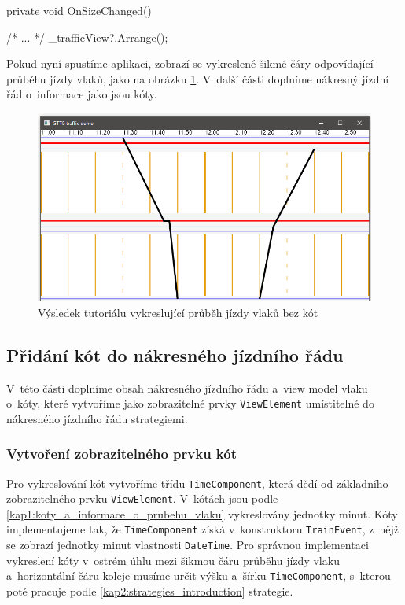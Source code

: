\begin{csharpcode}
private void OnSizeChanged() {
	
	/* ... */
	_trafficView?.Arrange();
}
\end{csharpcode}

Pokud nyní spustíme aplikaci, zobrazí se vykreslené šikmé čáry odpovídající průběhu jízdy vlaků, jako na obrázku \ref{fig:kap5:traffic_demo_without_time_components}. V~další části doplníme nákresný jízdní řád o~informace jako jsou kóty.

\begin{figure}[!hbt]
	\centering
	\includegraphics[width=.8\textwidth]{../img/kap5_tutorial_traffic_result}
	\caption{Výsledek tutoriálu vykreslující průběh jízdy vlaků bez kót}
	\label{fig:kap5:traffic_demo_without_time_components}
\end{figure}

\subsection*{Přidání kót do nákresného jízdního řádu}
V~této části doplníme obsah nákresného jízdního řádu a~view model vlaku o~kóty, které vytvoříme jako zobrazitelné prvky \texttt{ViewElement} umístitelné do nákresného jízdního řádu strategiemi.

\subsubsection*{Vytvoření zobrazitelného prvku kót}
Pro vykreslování kót vytvoříme třídu \texttt{TimeComponent}, která dědí od základního zobrazitelného prvku \texttt{ViewElement}. V~kótách jsou podle \ref{kap1:koty_a_informace_o_prubehu_vlaku} vykreslovány jednotky minut. Kóty implementujeme tak, že \texttt{TimeComponent} získá v~konstruktoru \texttt{TrainEvent}, z~nějž se zobrazí jednotky minut vlastnosti \texttt{DateTime}. Pro správnou implementaci vykreslení kóty v~ostrém úhlu mezi šikmou čáru průběhu jízdy vlaku a~horizontální čáru koleje musíme určit výšku a~šírku \texttt{TimeComponent}, s~kterou poté pracuje podle \ref{kap2:strategies_introduction} strategie. 

